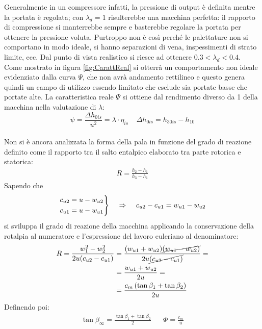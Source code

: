 Generalmente in un compressore infatti, la pressione di output è definita mentre la portata è regolata; con $\lambda_d = 1$ risulterebbe una macchina perfetta: il rapporto di compressione si manterrebbe sempre e basterebbe regolare la portata per ottenere la pressione voluta. Purtroppo non è così perché le palettature non si comportano in modo ideale, si hanno separazioni di vena, inspessimenti di strato limite, ecc. Dal punto di vista realistico si riesce ad ottenere $0.3<\lambda_d<0.4$.\\
Come mostrato in figura \ref{fig:CarattReal} si otterrà un comportamento non ideale evidenziato dalla curva $\Psi$, che non avrà andamento rettilineo e questo genera quindi un campo di utilizzo essendo limitato che esclude sia portate basse che portate alte. La caratteristica reale $\Psi$ si ottiene dal rendimento diverso da 1 della macchina nella valutazione di $\lambda$:
\begin{equation}
\psi = \frac{\Delta h_{0is}}{u^2} = \lambda \cdot \eta_{is} \;\;\;\; \Delta h_{0is} = h_{30is} - h_{10}
\end{equation}\\
Non si è ancora analizzata la forma della pala in funzione del grado di reazione definito come il rapporto tra il salto entalpico elaborato tra parte rotorica e statorica:
\begin{align*}
R = \frac{h_2 - h_1}{h_3-h_1} 
\end{align*}
Sapendo che
\begin{align*}
\begin{rcases*}
c_{u2} = u - w_{u2}\\
c_{u1} = u - w_{u1}
\end{rcases*}
\;\;\;\; \Rightarrow \;\;\;\; c_{u2} - c_{u1} = w_{u1} - w_{u2} 
\end{align*}
si sviluppa il grado di reazione della macchina applicando la conservazione della rotalpia al numeratore e l'espressione del lavoro euleriano al denominatore:
\begin{align*}
R = \frac{w_1^2 - w_2^2}{2 u (c_{u2} - c_{u1})} &= \frac{(w_{u1} + w_{u2})\cancel{(w_{u1}-w_{u2})}}{2 u \cancel{(c_{u2} - c_{u1})}} =\\
&= \frac{w_{u1} + w_{u2}}{2u} = \\
&= \frac{c_m \left(\tan \beta_1 + \tan \beta_2 \right)}{2 u}
\end{align*}
Definendo poi:
	\begin{align*}
	\tan \beta_{\infty} = \frac{\tan \beta_1 + \tan \beta_2}{2} \;\;\;\;\;\; \Phi = \frac{c_m}{u}
	\end{align*}
